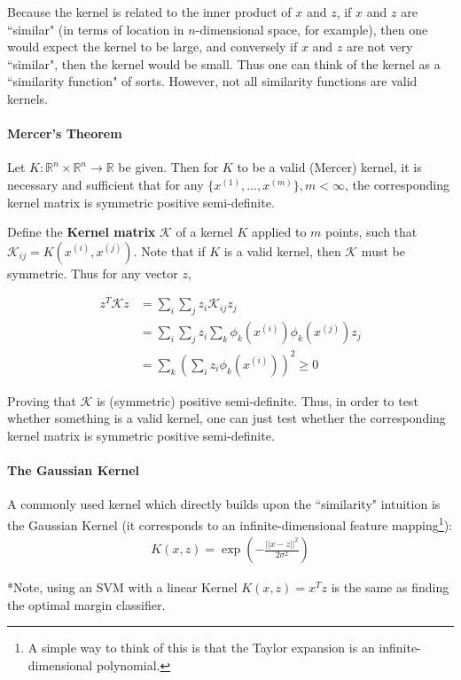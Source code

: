\documentclass[letterpaper,10pt]{article}
\begin{document}
Because the kernel is related to the inner product of $x$ and $z$, if $x$ and $z$ are ``similar" (in terms of location in $n$-dimensional space, for example), then one would expect the kernel to be large, and conversely if $x$ and $z$ are not very ``similar", then the kernel would be small. Thus one can think of the kernel as a ``similarity function" of sorts. However, not all similarity functions are valid kernels.

\paragraph{Mercer's Theorem} Let $K : \mathbb{R}^n \times \mathbb{R}^n \rightarrow \mathbb{R}$ be given. Then for $K$ to be a valid (Mercer) kernel, it is necessary and sufficient that for any $\{x^{(1)},\ldots,x^{(m)}\}, m<\infty$, the corresponding kernel matrix is symmetric positive semi-definite.

Define the \textbf{Kernel matrix} $\mathscr{K}$ of a kernel $K$ applied to $m$ points, such that $\mathscr{K}_{ij} = K(x^{(i)},x^{(j)})$. Note that if $K$ is a valid kernel, then $\mathscr{K}$ must be symmetric. Thus for any vector $z$,

\begin{align}
z^T \mathscr{K} z &= \sum_i \sum_j z_i \mathscr{K}_{ij} z_j \\
&= \sum_i \sum_j z_i \sum_k \phi_k(x^{(i)}) \phi_k (x^{(j)}) z_j \\
&= \sum_k \left( \sum_i z_i \phi_k(x^{(i)}) \right)^2 \geq 0
\end{align}

Proving that $\mathscr{K}$ is (symmetric) positive semi-definite. Thus, in order to test whether something is a valid kernel, one can just test whether the corresponding kernel matrix is symmetric positive semi-definite.

\paragraph{The Gaussian Kernel} A commonly used kernel which directly builds upon the ``similarity" intuition is the Gaussian Kernel (it corresponds to an infinite-dimensional feature mapping\footnote{A simple way to think of this is that the Taylor expansion is an infinite-dimensional polynomial.}):
\begin{align}
K(x,z) = \exp \left( -\frac{||x-z||^2}{2\sigma^2} \right)
\end{align}

*Note, using an SVM with a linear Kernel $K(x,z) = x^Tz$ is the same as finding the optimal margin classifier.
\end{document}
